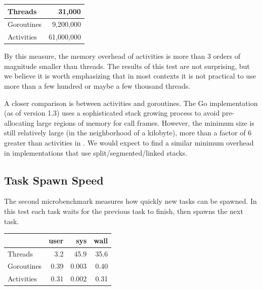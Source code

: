 \documentclass[9pt,preprint]{sigplanconf}
\begin{document}
\vspace{1em}
\begin{tabular}{|l|r|}
  \hline
  Threads & 31,000 \\
  \hline
  Goroutines & 9,200,000 \\
  \hline
  Activities & 61,000,000 \\
  \hline
\end{tabular}
\vspace{1em}

By this measure, the memory overhead of activities is more than 3 orders of magnitude smaller than threads.
The results of this test are not surprising, but we believe it is worth emphasizing that in most contexts it is not practical to use more than a few hundred or maybe a few thousand threads.

A closer comparison is between activities and goroutines.
The Go implementation (as of version 1.3) uses a sophisticated stack growing process to avoid pre-allocating large regions of memory for call frames.
However, the minimum size is still relatively large (in the neighborhood of a kilobyte), more than a factor of 6 greater than activities in \charcoal{}.
We would expect to find a similar minimum overhead in implementations that use split/segmented/linked stacks.


\subsection{Task Spawn Speed}


The second microbenchmark measures how quickly new tasks can be spawned.
In this test each task waits for the previous task to finish, then spawns the next task.

\vspace{1em}
\begin{tabular}{|l|r|r|r|}
  \hline
   & user & sys & wall \\
  \hline
  \hline
  Threads & 3.2 & 45.9 & 35.6 \\
  \hline
  Goroutines & 0.39 & 0.003 & 0.40 \\
  \hline
  Activities & 0.31 & 0.002 & 0.31 \\
  \hline
\end{tabular}
\vspace{1em}
\end{document}
